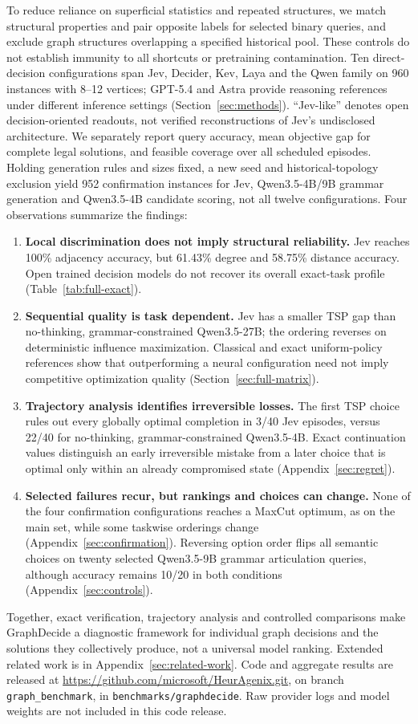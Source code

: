 To reduce reliance on superficial statistics and repeated structures, we
match structural properties and pair opposite labels for selected binary
queries, and exclude graph structures overlapping a specified historical
pool. These controls do not establish immunity to all shortcuts or
pretraining contamination. Ten direct-decision configurations span Jev,
Decider, Kev, Laya and the Qwen family on 960 instances with 8--12 vertices;
GPT-5.4 and Astra provide reasoning references under different inference
settings (Section~\ref{sec:methods}). ``Jev-like'' denotes open
decision-oriented readouts, not verified reconstructions of Jev's
undisclosed architecture. We separately report query accuracy, mean objective
gap for complete legal solutions, and feasible coverage over all scheduled
episodes. Holding generation rules and sizes fixed, a new seed and
historical-topology exclusion yield 952 confirmation instances for Jev,
Qwen3.5-4B/9B grammar generation and Qwen3.5-4B candidate scoring,
not all twelve configurations. Four observations summarize the findings:
\begin{enumerate}
\item \textbf{Local discrimination does not imply structural reliability.}
Jev reaches 100\% adjacency accuracy, but 61.43\% degree and 58.75\%
distance accuracy. Open trained decision models do not recover its overall
exact-task profile (Table~\ref{tab:full-exact}).
\item \textbf{Sequential quality is task dependent.}
Jev has a smaller TSP gap than no-thinking, grammar-constrained Qwen3.5-27B;
the ordering reverses on deterministic influence maximization.
Classical and exact uniform-policy references show that outperforming a
neural configuration need not imply competitive optimization quality
(Section~\ref{sec:full-matrix}).
\item \textbf{Trajectory analysis identifies irreversible losses.}
The first TSP choice rules out every globally optimal completion in 3/40
Jev episodes, versus 22/40 for no-thinking, grammar-constrained Qwen3.5-4B.
Exact continuation values distinguish an early irreversible mistake from
a later choice that is optimal only within an already compromised state
(Appendix~\ref{sec:regret}).
\item \textbf{Selected failures recur, but rankings and choices can change.}
None of the four confirmation configurations reaches a MaxCut optimum,
as on the main set, while some taskwise orderings change
(Appendix~\ref{sec:confirmation}). Reversing option order flips all semantic
choices on twenty selected Qwen3.5-9B grammar articulation queries,
although accuracy remains 10/20 in both conditions
(Appendix~\ref{sec:controls}).
\end{enumerate}
Together, exact verification, trajectory analysis and controlled comparisons
make GraphDecide a diagnostic framework for individual graph decisions and
the solutions they collectively produce, not a universal model ranking.
Extended related work is in Appendix~\ref{sec:related-work}.
Code and aggregate results are released at
\url{https://github.com/microsoft/HeurAgenix.git},
on branch \texttt{graph\_benchmark}, in
\texttt{benchmarks/graphdecide}. Raw provider logs and model weights are
not included in this code release.

